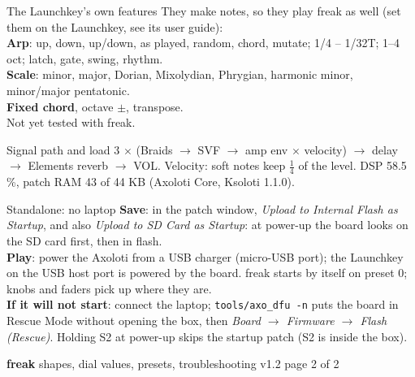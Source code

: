 \documentclass{article}
\begin{document}
\begin{minipage}[t]{63mm}\vspace{0pt}
\begin{card}{The Launchkey's own features}
They make notes, so they play freak as well (set them on the Launchkey, see its user guide):\\[0.4mm]
\textbf{Arp}: up, down, up/down, as played, random, chord, mutate; 1/4 -- 1/32T; 1--4 oct;
latch, gate, swing, rhythm.\\
\textbf{Scale}: minor, major, Dorian, Mixolydian, Phrygian, harmonic minor,
minor/major pentatonic.\\
\textbf{Fixed chord}, octave \(\pm\), transpose.\\[0.4mm]
{\color{black!55} Not yet tested with freak.}
\end{card}
\begin{card}{Signal path and load}
3 \(\times\) (Braids \(\to\) SVF \(\to\) amp env \(\times\) velocity) \(\to\) delay \(\to\)
Elements reverb \(\to\) VOL. Velocity: soft notes keep \(\frac14\) of the level.
DSP 58.5\,\%, patch RAM 43 of 44 KB (Axoloti Core, Ksoloti 1.1.0).
\end{card}
\begin{card}{Standalone: no laptop}
\textbf{Save}: in the patch window, \emph{Upload to Internal Flash as Startup}, and also
\emph{Upload to SD Card as Startup}: at power-up the board looks on the SD card first, then in flash.\\[0.4mm]
\textbf{Play}: power the Axoloti from a USB charger (micro-USB port); the Launchkey on the USB host port
is powered by the board. freak starts by itself on preset 0; knobs and faders pick up where they are.\\[0.4mm]
\textbf{If it will not start}: connect the laptop; \texttt{tools/axo\_dfu -n} puts the board in Rescue Mode
without opening the box, then \emph{Board \(\to\) Firmware \(\to\) Flash (Rescue)}. Holding S2 at power-up
skips the startup patch (S2 is inside the box).
\end{card}
\end{minipage}

\newpage
{\fontsize{16}{18}\selectfont\bfseries freak}\hspace{3mm}%
{\fontsize{9.5}{11}\selectfont shapes, dial values, presets, troubleshooting}\hfill
{\fontsize{7}{8}\selectfont\color{black!55} v1.2 \textperiodcentered{} page 2 of 2}
\end{document}

